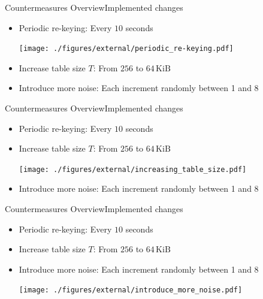 \documentclass[aspectratio=169, hyperref={colorlinks=true, allcolors=SecondaryColor}, c]{beamer}
\begin{document}
	\begin{frame}[fragile]{Countermeasures Overview}{Implemented changes}
		\begin{itemize}
			\item \alert{Periodic re-keying}: Every $10$ seconds

			\texttt{[image: ./figures/external/periodic\_re-keying.pdf]} %
			\item \alert{Increase table size $T$}: From $256$ to $64\,\text{KiB}$

			\item \alert{Introduce more noise}: Each increment randomly between 1 and 8

		\end{itemize}
	\end{frame}

	\begin{frame}[fragile]{Countermeasures Overview}{Implemented changes}
		\begin{itemize}
			\item \alert{Periodic re-keying}: Every $10$ seconds

			\item \alert{Increase table size $T$}: From $256$ to $64\,\text{KiB}$

			\texttt{[image: ./figures/external/increasing\_table\_size.pdf]} %
			\item \alert{Introduce more noise}: Each increment randomly between 1 and 8

		\end{itemize}
	\end{frame}

	\begin{frame}[fragile]{Countermeasures Overview}{Implemented changes}
		\begin{itemize}
			\item \alert{Periodic re-keying}: Every $10$ seconds

			\item \alert{Increase table size $T$}: From $256$ to $64\,\text{KiB}$

			\item \alert{Introduce more noise}: Each increment randomly between 1 and 8

			\texttt{[image: ./figures/external/introduce\_more\_noise.pdf]} %
		\end{itemize}
	\end{frame}
\end{document}
